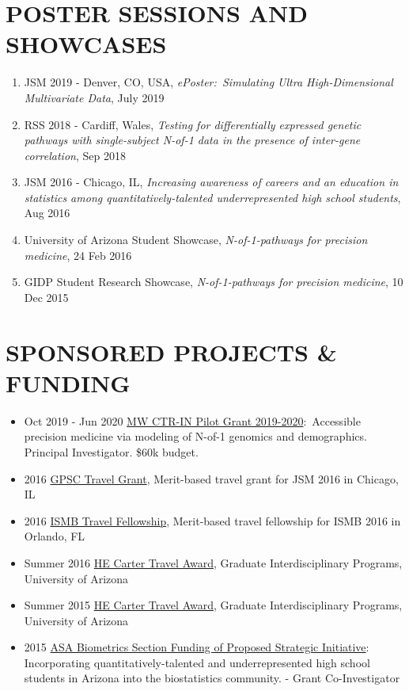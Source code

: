 \documentclass[paper=a4,fontsize=11pt]{scrartcl} %
\newcommand{\NewPart}[2]{\section*{\uppercase{#1} #2 }}
\newcommand{\TalkEntry}[4]{
		\noindent #1, #2, #3 #4}
\begin{document}
\NewPart{Poster sessions and Showcases}{}
\vspace{-7pt}
\begin{enumerate}
    \item\TalkEntry{JSM 2019 - Denver, CO, USA}{\textit{ePoster:~Simulating Ultra High-Dimensional Multivariate Data}}{July 2019}{}
  \item\TalkEntry{RSS 2018 - Cardiff, Wales}{\textit{Testing for differentially expressed genetic pathways with single-subject N-of-1 data in the presence of inter-gene correlation}}{Sep 2018}{}
\item\TalkEntry{JSM 2016 - Chicago, IL}{\textit{Increasing awareness of careers and an education in statistics among quantitatively-talented underrepresented high school students}}{Aug 2016}{}
\item\TalkEntry{University of Arizona Student Showcase}{\textit{N-of-1-pathways for precision medicine}}{24 Feb 2016}{}
\item\TalkEntry{GIDP Student Research Showcase}{\textit{N-of-1-pathways for precision medicine}}{10 Dec 2015}{}
\vspace{-7pt}
\end{enumerate}


\NewPart{Sponsored Projects \& Funding}{}
\vspace{-7pt}

\begin{itemize}[noitemsep]
      \item Oct 2019 - Jun 2020 \href{http://ctrin.unlv.edu/about/}{MW CTR-IN Pilot Grant 2019-2020}:~Accessible precision medicine via modeling of N-of-1 genomics and demographics. Principal Investigator. \$60k budget.
\item 2016 \href{http://gpsc.arizona.edu/travel-grants}{GPSC Travel Grant}, Merit-based travel grant for JSM 2016 in Chicago, IL
\item 2016 \href{https://www.iscb.org/ismb2016-submission/ismb2016-travel-fellowship-2}{ISMB Travel Fellowship}, Merit-based travel fellowship for ISMB 2016 in Orlando, FL
\item Summer 2016 \href{https://gidp.arizona.edu/carter-travel-award/award-recipients}{HE Carter Travel Award}, Graduate Interdisciplinary Programs, University of Arizona 
\item Summer 2015 \href{https://gidp.arizona.edu/carter-travel-award/award-recipients}{HE Carter Travel Award}, Graduate Interdisciplinary Programs, University of Arizona 
\item 2015 \href{http://stattrak.amstat.org/2014/03/01/grant-opportunity}{ASA Biometrics Section Funding of Proposed Strategic Initiative}:  Incorporating quantitatively-talented and underrepresented high school students in Arizona into the biostatistics community. - Grant Co-Investigator
\end{itemize}
\end{document}
